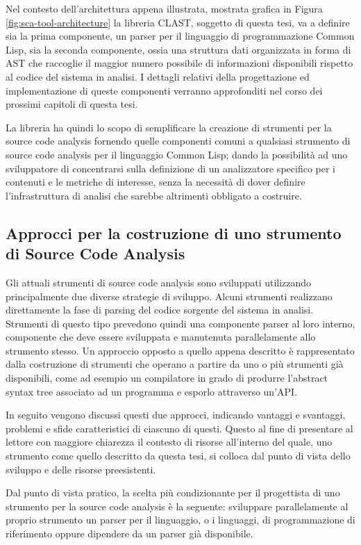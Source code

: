 Nel contesto dell'architettura appena illustrata, mostrata grafica in Figura
\ref{fig:sca-tool-architecture} la libreria CLAST, soggetto di questa tesi, va a
definire sia la prima componente, un parser per il linguaggio di programmazione
Common Lisp, sia la seconda componente, ossia una struttura dati organizzata in
forma di AST che raccoglie il maggior numero possibile di informazioni
disponibili rispetto al codice del sistema in analisi. I dettagli relativi della
progettazione ed implementazione di queste componenti verranno approfonditi nel
corso dei prossimi capitoli di questa tesi.

La libreria ha quindi lo scopo di semplificare la creazione di strumenti per la
source code analysis fornendo quelle componenti comuni a qualsiasi strumento di
source code analysis per il linguaggio Common Lisp; dando la possibilità ad uno
sviluppatore di concentrarsi sulla definizione di un analizzatore specifico per
i contenuti e le metriche di interesse, senza la necessità di dover definire
l'infrastruttura di analisi che sarebbe altrimenti obbligato a costruire.

\subsection{Approcci per la costruzione di uno strumento di Source Code
Analysis}
\label{sca-approches}

Gli attuali strumenti di source code analysis sono sviluppati utilizzando
principalmente due diverse strategie di sviluppo. Alcuni strumenti realizzano
direttamente la fase di parsing del codice sorgente del sistema in analisi.
Strumenti di questo tipo prevedono quindi una componente parser al loro interno,
componente che deve essere sviluppata e manutenuta parallelamente allo strumento
stesso. Un approccio opposto a quello appena descritto è rappresentato dalla
costruzione di strumenti che operano a partire da uno o più strumenti già
disponibili, come ad esempio un compilatore in grado di produrre l'abstract
syntax tree associato ad un programma e esporlo attraverso un’API.

In seguito vengono discussi questi due approcci, indicando vantaggi e
svantaggi, problemi e sfide caratteristici di ciascuno di questi. Questo al
fine di presentare al lettore con maggiore chiarezza il contesto di risorse
all’interno del quale, uno strumento come quello descritto da questa tesi, si
colloca dal punto di vista dello sviluppo e delle risorse preesistenti.

Dal punto di vista pratico, la scelta più condizionante per il progettista di
uno strumento per la source code analysis è la seguente: sviluppare
parallelamente al proprio strumento un parser per il linguaggio, o i linguaggi,
di programmazione di riferimento oppure dipendere da un parser già disponibile.

